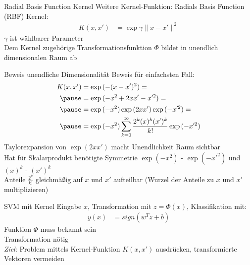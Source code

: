 \documentclass[ngerman]{beamer}
\newcommand{\norm}[1]{\lVert#1\rVert}
\begin{document}
\begin{frame}{Radial Basis Function Kernel}
    Weitere Kernel-Funktion: Radials Basis Function (RBF) Kernel: \\ \pause
    \begin{equation*} \label{eq:rbfk_pres}
    \begin{aligned}
        K(x, x') &= \exp{\gamma \norm{x - x'}^2}
    \end{aligned}
    \end{equation*} \pause
    $\gamma$ ist wählbarer Parameter \\ \pause
    Dem Kernel zugehörige Transformationsfunktion $\Phi$ bildet in unendlich dimensionalen Raum ab
\end{frame}

\begin{frame}{Beweis unendliche Dimensionalität}
    Beweis für einfachsten Fall: \\ \pause
    \begin{equation*} \label{eq:proof_rbfk_infinite_pres}
    \begin{aligned}
        K(x, x') &= \exp{(-(x - x')^{2})} =\\ \pause
        &= \exp{(-x^{2} + 2xx' - x'^{2})} = \\ \pause
        &= \exp{(-x^{2})} \exp{(2xx')} \exp{(-x'^{2})} = \\ \pause
        &= \exp{(-x^{2})} \sum_{k=0}^{\infty} \frac{2^{k} (x)^{k} (x')^{k}}{k!} \exp{(-x'^{2})}
    \end{aligned}
    \end{equation*} \pause
    Taylorexpansion von $\exp{(2xx')}$ macht Unendlichkeit Raum sichtbar \\ \pause
    Hat für Skalarprodukt benötigte Symmetrie $\exp(-x^{2})$ - $\exp(-x'^{2})$ und $(x)^{k}$ - $(x')^{k}$ \\ \pause
    Anteile $\frac{2^k}{k!}$ gleichmäßig auf $x$ und $x'$ aufteilbar (Wurzel der Anteile zu $x$ und $x'$ multiplizieren)
\end{frame}

\begin{frame}{SVM mit Kernel}
    Eingabe $x$, Transformation mit  $z = \Phi(x)$, Klassifikation mit: \\ \pause
    \begin{equation} \label{eq:svm_def_kernel_pres}
    \begin{aligned}
        y(x) &= sign(w^{T} z + b)
    \end{aligned}
    \end{equation} \pause
    Funktion $\Phi$ muss bekannt sein \\ \pause
    Transformation nötig \\ \pause
    \emph{Ziel}: Problem mittels Kernel-Funktion $K(x, x')$ ausdrücken, transformierte Vektoren vermeiden
\end{frame}
\end{document}
